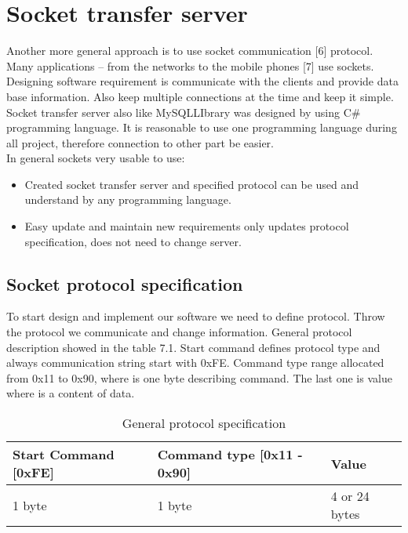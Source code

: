 %
\section{Socket transfer server}

Another more general approach is to use socket communication [6] protocol. Many applications – from the networks to the mobile phones [7] use sockets. Designing software requirement is communicate with the clients and provide data base information. Also keep multiple connections at the time and keep it simple.  Socket transfer server also like MySQLLIbrary was designed by using C\# programming language. It is reasonable to use one programming language during all project, therefore connection to other part be easier. \\ In general sockets very usable to use: 

\begin{itemize}
	\item Created socket transfer server and specified protocol can be used and understand by any programming language.
	\item Easy update and maintain new requirements only updates protocol specification, does not need to change server.
\end{itemize}

\subsection{Socket protocol specification}

To start design and implement our software we need to define protocol. Throw the protocol we communicate and change information. General protocol description showed in the table 7.1. Start command defines protocol type and always communication string start with 0xFE. Command type range allocated from 0x11 to 0x90, where is one byte describing command. The last one is value where is a content of data.

\begin{table}[h]
	\centering
    \begin{tabular}{ | p{4cm} | p{5cm} | p{4cm} | }
    \hline
    \textbf{Start Command} [0xFE] & \textbf{Command type} [0x11 - 0x90] & \textbf{Value}  \\ \hline
    1 byte & 1 byte & 4 or 24 bytes  \\ \hline
    \end{tabular}
	\caption{General protocol specification}
	\label{tab:protocolSpec}
\end{table}

